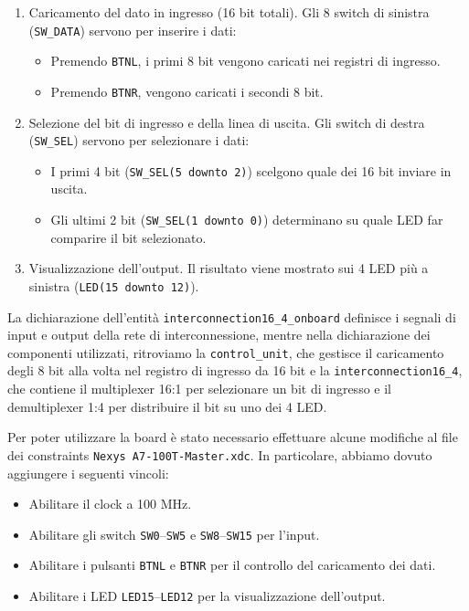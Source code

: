\begin{enumerate}
    \item Caricamento del dato in ingresso (16 bit totali). Gli 8 switch di sinistra (\texttt{SW\_DATA}) servono per inserire i dati:
          \begin{itemize}
              \item Premendo \texttt{BTNL}, i primi 8 bit vengono caricati nei registri di ingresso.
              \item Premendo \texttt{BTNR}, vengono caricati i secondi 8 bit.
          \end{itemize}
    \item Selezione del bit di ingresso e della linea di uscita. Gli switch di destra (\texttt{SW\_SEL}) servono per selezionare i dati:
          \begin{itemize}
              \item I primi 4 bit (\texttt{SW\_SEL(5 downto 2)}) scelgono quale dei 16 bit inviare in uscita.
              \item Gli ultimi 2 bit (\texttt{SW\_SEL(1 downto 0)}) determinano su quale LED far comparire il bit selezionato.
          \end{itemize}
    \item Visualizzazione dell’output. Il risultato viene mostrato sui 4 LED più a sinistra (\texttt{LED(15 downto 12)}).
\end{enumerate}

La dichiarazione dell’entità \texttt{interconnection16\_4\_onboard} definisce i segnali di input e output della rete di interconnessione, mentre nella dichiarazione dei componenti utilizzati, ritroviamo la \texttt{control\_unit}, che gestisce il caricamento degli 8 bit alla volta nel registro di ingresso da 16 bit e la \texttt{interconnection16\_4}, che contiene il multiplexer 16:1 per selezionare un bit di ingresso e il demultiplexer 1:4 per distribuire il bit su uno dei 4 LED.

Per poter utilizzare la board è stato necessario effettuare alcune modifiche al file dei constraints \texttt{Nexys A7-100T-Master.xdc}. In particolare, abbiamo dovuto aggiungere i seguenti vincoli:
\begin{itemize}
    \item Abilitare il clock a 100 MHz.
    \item Abilitare gli switch \texttt{SW0}--\texttt{SW5} e \texttt{SW8}--\texttt{SW15} per l’input.
    \item Abilitare i pulsanti \texttt{BTNL} e \texttt{BTNR} per il controllo del caricamento dei dati.
    \item Abilitare i LED \texttt{LED15}--\texttt{LED12} per la visualizzazione dell’output.
\end{itemize}

